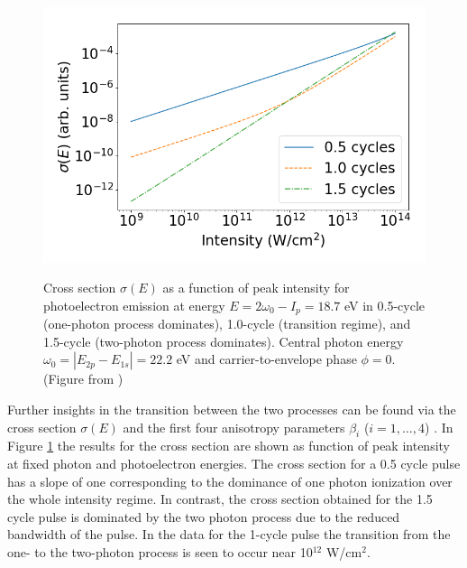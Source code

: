 \begin{figure}[!ht]
\centering
\includegraphics[width=0.49\linewidth]{figs/Photo_ionization/short_pulse/beta_0_cyc.png}\\
\caption{Cross section $\sigma(E)$ as a function of peak intensity for photoelectron emission at energy $E = 2\omega_0 - I_p = 18.7$ eV in 0.5-cycle (one-photon process dominates), 1.0-cycle (transition regime), and 1.5-cycle (two-photon process dominates). Central photon energy $\omega_0 = |E_{2p} - E_{1s}| = 22.2$ eV and carrier-to-envelope phase $\phi=0$.  (Figure from \cite{venzke2020_ionization})
} 
  \label{fig:cross}
\end{figure}

Further insights in the transition between the two processes can be found via the cross section $\sigma(E)$
and the first four anisotropy parameters $\beta_i$ ($i = 1, \ldots, 4$) . In Figure \ref{fig:cross} the results for the cross section are shown as function of peak intensity at fixed photon and photoelectron energies. The cross section for a 0.5 cycle pulse has a slope of one corresponding to the dominance of one photon ionization over the whole intensity regime. In contrast, the cross section obtained for the 1.5 cycle pulse is dominated by the two photon process due to the reduced bandwidth of the pulse. In the data for the 1-cycle pulse the transition from the one- to the two-photon process is seen to occur near 10$^{12}$ W/cm$^2$. 

